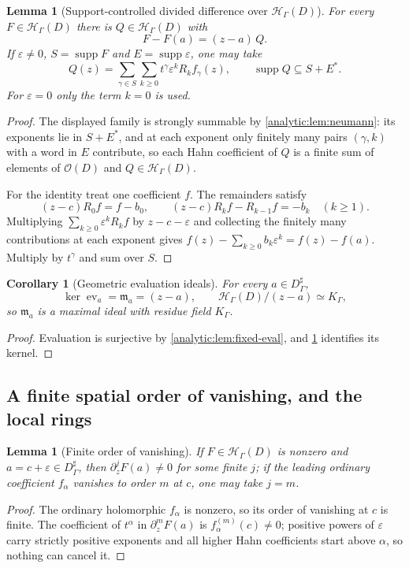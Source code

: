 \documentclass[11pt,letterpaper]{article}
\newtheorem{lemma}[theorem]{Lemma}
\newtheorem{corollary}[theorem]{Corollary}
\theoremstyle{definition}
\theoremstyle{remark}
\newcommand{\HH}{\mathcal H}
\newcommand{\m}{\mathfrak m}
\newcommand{\OO}{\mathcal O}
\newcommand{\supp}{\operatorname{supp}}
\newcommand{\ev}{\operatorname{ev}}
\numberwithin{equation}{section}
\begin{document}
\begin{lemma}[Support-controlled divided difference over $\HH_\Gamma(D)$]
\label{analytic:lem:fixed-division}
For every $F\in\HH_\Gamma(D)$ there is $Q\in\HH_\Gamma(D)$ with
\begin{equation}\label{analytic:eq:fixed-division}
 F-F(a)=(z-a)\,Q .
\end{equation}
If $\varepsilon\ne0$, $S=\supp F$ and $E=\supp\varepsilon$, one may take
\begin{equation}\label{analytic:eq:fixed-division-explicit}
 Q(z)=\sum_{\gamma\in S}\sum_{k\ge0}t^\gamma\varepsilon^kR_kf_\gamma(z),
 \qquad \supp Q\subseteq S+E^* .
\end{equation}
For $\varepsilon=0$ only the term $k=0$ is used.
\end{lemma}
\begin{proof}
The displayed family is strongly summable by
\cref{analytic:lem:neumann}: its exponents lie in $S+E^*$, and at each
exponent only finitely many pairs $(\gamma,k)$ with a word in $E$
contribute, so each Hahn coefficient of $Q$ is a finite sum of elements of
$\OO(D)$ and $Q\in\HH_\Gamma(D)$.

For the identity treat one coefficient $f$. The remainders satisfy
\[
 (z-c)R_0f=f-b_0,\qquad (z-c)R_kf-R_{k-1}f=-b_k\quad(k\ge1).
\]
Multiplying $\sum_{k\ge0}\varepsilon^kR_kf$ by $z-c-\varepsilon$ and
collecting the finitely many contributions at each exponent gives
$f(z)-\sum_{k\ge0}b_k\varepsilon^k=f(z)-f(a)$. Multiply by $t^\gamma$ and
sum over $S$.
\end{proof}

\begin{corollary}[Geometric evaluation ideals]
\label{analytic:cor:fixed-eval-ideal}
For every $a\in D^\sharp_\Gamma$,
\[
 \ker\ev_a=\m_a=(z-a),\qquad \HH_\Gamma(D)/(z-a)\simeq K_\Gamma ,
\]
so $\m_a$ is a maximal ideal with residue field $K_\Gamma$.
\end{corollary}
\begin{proof}
Evaluation is surjective by \cref{analytic:lem:fixed-eval}, and
\cref{analytic:lem:fixed-division} identifies its kernel.
\end{proof}

\subsection{A finite spatial order of vanishing, and the local rings}
\begin{lemma}[Finite order of vanishing]\label{analytic:lem:fixed-finite-order}
If $F\in\HH_\Gamma(D)$ is nonzero and $a=c+\varepsilon\in D^\sharp_\Gamma$,
then $\partial_z^jF(a)\ne0$ for some finite $j$; if the leading ordinary
coefficient $f_\alpha$ vanishes to order $m$ at $c$, one may take $j=m$.
\end{lemma}
\begin{proof}
The ordinary holomorphic $f_\alpha$ is nonzero, so its order of vanishing
at $c$ is finite. The coefficient of $t^\alpha$ in $\partial_z^mF(a)$ is
$f_\alpha^{(m)}(c)\ne0$; positive powers of $\varepsilon$ carry strictly
positive exponents and all higher Hahn coefficients start above $\alpha$,
so nothing can cancel it.
\end{proof}
\end{document}
